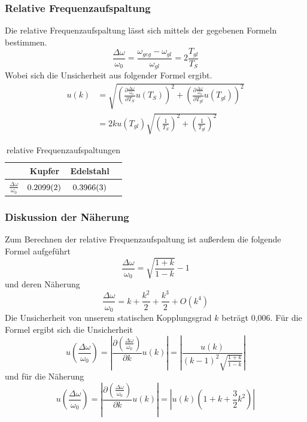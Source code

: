 \documentclass[
	a4paper,
	12pt,
	pagesize,
	ngerman
]{scrartcl}
\begin{document}
	\subsubsection{Relative Frequenzaufspaltung}
	Die relative Frequenzaufspaltung lässt sich mittels der gegebenen Formeln bestimmen.
	\begin{equation}
		\frac{\Delta\omega}{\omega_0} = \frac{\omega_{geg}-\omega_{gl}}{\omega_{gl}} = 2\frac{T_{gl}}{T_S}
	\end{equation}
	Wobei sich die Unsicherheit aus folgender Formel ergibt.
	\begin{align}
		u(k) &= \sqrt{\left(\frac{\partial \frac{\Delta\omega}{\omega_0} }{\partial T_{S}}u(T_{S}) \right)^2 + \left(\frac{\partial \frac{\Delta\omega}{\omega_0} }{\partial T_{gl}}u(T_{gl}) \right)^2 } \\
			&= 2ku(T_{gl}) \sqrt{\left(\frac{1}{T_S}\right)^2 + \left(\frac{1}{T_{gl}}\right)^2 }
	\end{align}

	\begin{table}[H]
	\centering
	\begin{tabular}{ l | c | c | c |}
		& Kupfer & Edelstahl  \\ \hline
		$\frac{\Delta\omega}{\omega_0}  $ &$\SI{0,2099 \pm 0,0002}{}$&$\SI{0,3966 \pm 0,0003}{}$\\  \hline
	\end{tabular}
	\caption{relative Frequenzaufspaltungen}
	\end{table}

	\subsubsection{Diskussion der Näherung}
	Zum Berechnen der relative Frequenzaufspaltung ist außerdem die folgende Formel aufgeführt
	\begin{equation}
		\frac{\Delta\omega}{\omega_0} = \sqrt{\frac{1+k}{1-k}} -1 
	\end{equation}
	und deren Näherung
	\begin{equation}
		\frac{\Delta\omega}{\omega_0} = k + \frac{k^2}{2} + \frac{k^3}{2} + O(k^4)
	\end{equation}
	Die Unsicherheit von unserem statischen Kopplungsgrad $k$ beträgt 0,006. Für die Formel ergibt sich die Unsicherheit
	\begin{equation}
		u\left({\frac{\Delta\omega}{\omega_0}}\right) = \left| \frac{\partial (\frac{\Delta\omega}{\omega_0})}{\partial k} u(k)\right| = \left|\frac{u(k)}{(k-1)^2\sqrt{\frac{1+k}{1-k}}} \right|
	\end{equation}
	und für die Näherung
	\begin{equation}
		u\left({\frac{\Delta\omega}{\omega_0}}\right) = \left| \frac{\partial (\frac{\Delta\omega}{\omega_0})}{\partial k} u(k)\right| = \left| u(k)(1+k+\frac{3}{2}k^2) \right|
	\end{equation}
\end{document}
